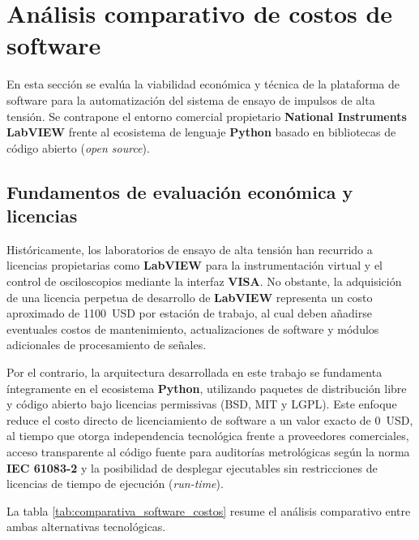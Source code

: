 \section{Análisis comparativo de costos de software} \label{sec:comparativa_costos_software}

En esta sección se evalúa la viabilidad económica y técnica de la plataforma de software para la automatización del sistema de ensayo de impulsos de alta tensión. Se contrapone el entorno comercial propietario \textbf{National Instruments LabVIEW} frente al ecosistema de lenguaje \textbf{Python} basado en bibliotecas de código abierto (\emph{open source}).

\subsection{Fundamentos de evaluación económica y licencias} \label{subsec:evaluacion_licencias}

Históricamente, los laboratorios de ensayo de alta tensión han recurrido a licencias propietarias como \textbf{LabVIEW} para la instrumentación virtual y el control de osciloscopios mediante la interfaz \textbf{VISA}. No obstante, la adquisición de una licencia perpetua de desarrollo de \textbf{LabVIEW} representa un costo aproximado de \qty{1100}{USD} por estación de trabajo, al cual deben añadirse eventuales costos de mantenimiento, actualizaciones de software y módulos adicionales de procesamiento de señales.

Por el contrario, la arquitectura desarrollada en este trabajo se fundamenta íntegramente en el ecosistema \textbf{Python}, utilizando paquetes de distribución libre y código abierto bajo licencias permissivas (BSD, MIT y LGPL). Este enfoque reduce el costo directo de licenciamiento de software a un valor exacto de \qty{0}{USD}, al tiempo que otorga independencia tecnológica frente a proveedores comerciales, acceso transparente al código fuente para auditorías metrológicas según la norma \textbf{IEC 61083-2} \cite{iec61083_2} y la posibilidad de desplegar ejecutables sin restricciones de licencias de tiempo de ejecución (\emph{run-time}).

La tabla \ref{tab:comparativa_software_costos} resume el análisis comparativo entre ambas alternativas tecnológicas.

